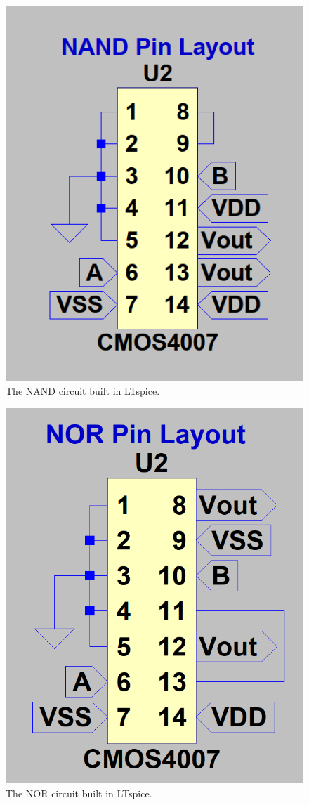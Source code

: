 \documentclass[12pt, titlepage]{article}
\begin{document}
    \begin{multicols}{2}
        \begin{figure}[H]
            \centering
            \includegraphics[width=0.6\linewidth]{figures/NAND_circuit.png}
            \caption{The NAND circuit built in LTspice.}
            \label{fig:NAND_lt}
        \end{figure}
        \begin{figure}[H]
            \centering
            \includegraphics[width=0.6\linewidth]{figures/NOR_circuit.png}
            \caption{The NOR circuit built in LTspice.}
            \label{fig:NOR_lt}
        \end{figure}
        \begin{figure}[H]

\end{figure}
\end{multicols}
\end{document}
